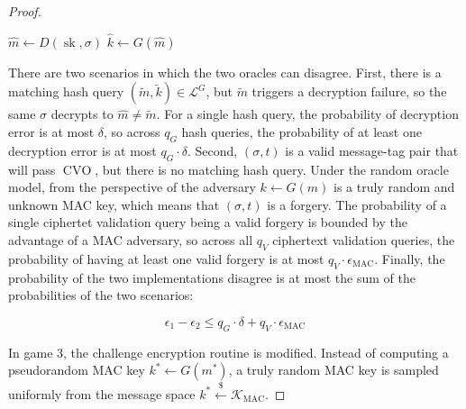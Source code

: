 \documentclass{article}
\newcommand{\leftsample}{\overset{{\scriptscriptstyle\$}}{\leftarrow}}
\newcommand{\pk}{\operatorname{pk}}
\newcommand{\sk}{\operatorname{sk}}
\newcommand{\cvo}{\operatorname{CVO}}
\newcommand{\llbrack}{[\![}
\newcommand{\rrbrack}{]\!]}
\begin{document}
\begin{proof}
    \begin{multicols}{2}
        \begin{algorithm}[H]
            \caption{$\cvo$}
            \SetAlgoLined
            $\hat{m} \leftarrow D(\sk, \sigma)$\;
            $\hat{k} \leftarrow G(\hat{m})$\;
            \Return{
                $\llbrack V(\hat{k}, \sigma, t) = 1 \rrbrack$
            }
        \end{algorithm}

        \begin{algorithm}[H]
            \caption{$\cvo_1$}
            \SetAlgoLined
            \If{
                $\exists (\tilde{m}, \tilde{k}) \in \mathcal{L}^G$ s.t.
                $E(\pk, \tilde{m}) = c$ and $V(\tilde{k}, \sigma, t) = 1$
            }{
                \Return{$1$}\;
            }
            \;
        \end{algorithm}
    \end{multicols}

    There are two scenarios in which the two oracles can disagree. First, there is a matching hash query $(\tilde{m}, \tilde{k}) \in \mathcal{L}^G$, but $\tilde{m}$ triggers a decryption failure, so the same $\sigma$ decrypts to $\hat{m} \neq \tilde{m}$. For a single hash query, the probability of decryption error is at most $\delta$, so across $q_G$ hash queries, the probability of at least one decryption error is at most $q_G \cdot \delta$. Second, $(\sigma, t)$ is a valid message-tag pair that will pass $\cvo$, but there is no matching hash query. Under the random oracle model, from the perspective of the adversary $k \leftarrow G(m)$ is a truly random and unknown MAC key, which means that $(\sigma, t)$ is a forgery. The probability of a single ciphertet validation query being a valid forgery is bounded by the advantage of a MAC adversary, so across all $q_V$ ciphertext validation queries, the probability of having at least one valid forgery is at most $q_V\cdot\epsilon_\text{MAC}$. Finally, the probability of the two implementations disagree is at most the sum of the probabilities of the two scenarios:

    \begin{equation*}
        \epsilon_1 - \epsilon_2 \leq q_G \cdot \delta + q_V \cdot \epsilon_\text{MAC}
    \end{equation*}

    In game 3, the challenge encryption routine is modified. Instead of computing a pseudorandom MAC key $k^\ast \leftarrow G(m^\ast)$, a truly random MAC key is sampled uniformly from the message space $k^\ast \leftsample \mathcal{K}_\text{MAC}$.


\end{proof}
\end{document}
